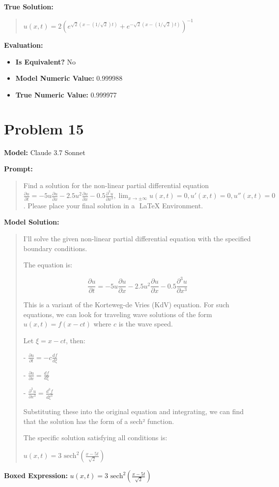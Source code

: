 \documentclass{article}
\begin{document}
\textbf{True Solution:}
\begin{quote}
$u(x, t) = 2(e^{\sqrt{2}(x - (1/\sqrt{2})t)} + e^{-\sqrt{2}(x - (1/\sqrt{2})t)})^{-1}$
\end{quote}

\textbf{Evaluation:}
\begin{itemize}
\item \textbf{Is Equivalent?} No
\item \textbf{Model Numeric Value:} 0.999988
\item \textbf{True Numeric Value:} 0.999977
\end{itemize}
\vspace{1cm}
\section*{Problem 15}
\textbf{Model:} Claude 3.7 Sonnet

\textbf{Prompt:}
\begin{quote}
Find a solution for the non-linear partial differential equation $\frac{\partial u}{\partial t} = -5u\frac{\partial u}{\partial x} -2.5u^2\frac{\partial u}{\partial x} - 0.5\frac{\partial^3 u}{\partial x^3},\lim_{x \to \pm \infty} u(x,t) = 0,u'(x,t) = 0,u''(x,t) = 0$. Please place your final solution in a $\boxed{}$ LaTeX Environment.
\end{quote}
\textbf{Model Solution:}
\begin{quote}
I'll solve the given non-linear partial differential equation with the specified boundary conditions.



The equation is:

$$\frac{\partial u}{\partial t} = -5u\frac{\partial u}{\partial x} -2.5u^2\frac{\partial u}{\partial x} - 0.5\frac{\partial^3 u}{\partial x^3}$$



This is a variant of the Korteweg-de Vries (KdV) equation. For such equations, we can look for traveling wave solutions of the form $u(x,t) = f(x-ct)$ where $c$ is the wave speed.



Let $\xi = x-ct$, then:

- $\frac{\partial u}{\partial t} = -c\frac{df}{d\xi}$

- $\frac{\partial u}{\partial x} = \frac{df}{d\xi}$

- $\frac{\partial^3 u}{\partial x^3} = \frac{d^3f}{d\xi^3}$



Substituting these into the original equation and integrating, we can find that the solution has the form of a sech² function.



The specific solution satisfying all conditions is:



$\boxed{u(x,t) = 3\text{ sech}^2\left(\frac{x-5t}{\sqrt{2}}\right)}$
\end{quote}
\textbf{Boxed Expression:} $u(x,t) = 3\text{ sech}^2\left(\frac{x-5t}{\sqrt{2}}\right)$
\end{document}
